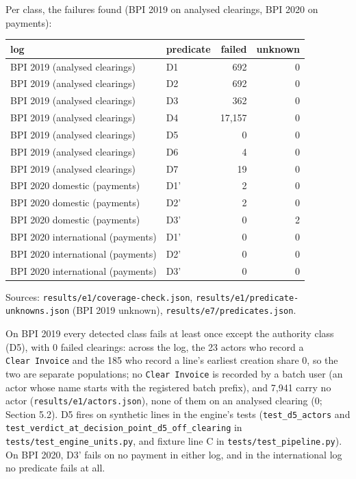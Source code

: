\documentclass[
  10pt,
]{article}
\begin{document}
Per class, the failures found (BPI 2019 on analysed clearings, BPI 2020
on payments):

\begin{longtable}[]{@{}llrr@{}}
\toprule\noalign{}
log & predicate & failed & unknown \\
\midrule\noalign{}
\endhead
\bottomrule\noalign{}
\endlastfoot
BPI 2019 (analysed clearings) & D1 & 692 & 0 \\
BPI 2019 (analysed clearings) & D2 & 692 & 0 \\
BPI 2019 (analysed clearings) & D3 & 362 & 0 \\
BPI 2019 (analysed clearings) & D4 & 17,157 & 0 \\
BPI 2019 (analysed clearings) & D5 & 0 & 0 \\
BPI 2019 (analysed clearings) & D6 & 4 & 0 \\
BPI 2019 (analysed clearings) & D7 & 19 & 0 \\
BPI 2020 domestic (payments) & D1' & 2 & 0 \\
BPI 2020 domestic (payments) & D2' & 2 & 0 \\
BPI 2020 domestic (payments) & D3' & 0 & 2 \\
BPI 2020 international (payments) & D1' & 0 & 0 \\
BPI 2020 international (payments) & D2' & 0 & 0 \\
BPI 2020 international (payments) & D3' & 0 & 0 \\
\end{longtable}

Sources: \texttt{results/e1/coverage-check.json},
\texttt{results/e1/predicate-unknowns.json} (BPI 2019 unknown),
\texttt{results/e7/predicates.json}.

On BPI 2019 every detected class fails at least once except the
authority class (D5), with 0 failed clearings: across the log, the 23
actors who record a \texttt{Clear\ Invoice} and the 185 who record a
line's earliest creation share 0, so the two are separate populations;
no \texttt{Clear\ Invoice} is recorded by a batch user (an actor whose
name starts with the registered batch prefix), and 7,941 carry no actor
(\texttt{results/e1/actors.json}), none of them on an analysed clearing
(0; Section 5.2). D5 fires on synthetic lines in the engine's tests
(\texttt{test\_d5\_actors} and
\texttt{test\_verdict\_at\_decision\_point\_d5\_off\_clearing} in
\texttt{tests/test\_engine\_units.py}, and fixture line C in
\texttt{tests/test\_pipeline.py}). On BPI 2020, D3' fails on no payment
in either log, and in the international log no predicate fails at all.
\end{document}
